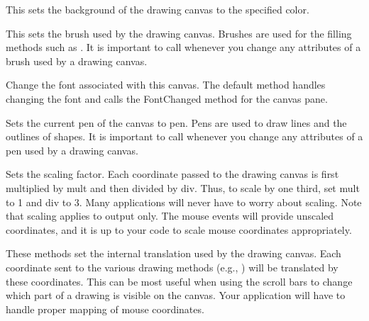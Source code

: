 
This sets the background of the drawing canvas to the
specified color.


This sets the brush used by the drawing canvas. Brushes are used
for the filling methods such as . It is
important to call  whenever you change any
attributes of a brush used by a drawing canvas.


Change the font associated with this canvas. The default method
handles changing the font and calls the FontChanged method for
the canvas pane.


Sets the current pen of the canvas to pen. Pens are used
to draw lines and the outlines of shapes. It is important
to call  whenever you change any attributes of
a pen used by a drawing canvas.


Sets the scaling factor. Each coordinate passed to the 
drawing canvas is first multiplied by mult and then divided
by div. Thus, to scale by one third, set mult to 1 and div to 3.
Many applications will never have to worry about scaling.
Note that scaling applies to output only. The mouse
events will provide unscaled coordinates, and it is up
to your code to scale mouse coordinates appropriately.


These methods set the internal translation used by the
drawing canvas. Each coordinate sent to the various
drawing methods (e.g., ) will be
translated by these coordinates. This can be most useful
when using the scroll bars to change which part of a
drawing is visible on the canvas. Your application will
have to handle proper mapping of mouse coordinates.

